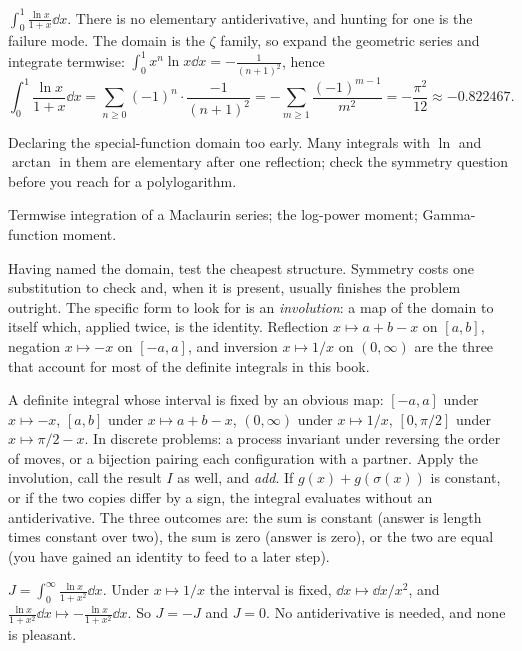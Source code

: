 \begin{worked}
$\displaystyle\int_{0}^{1}\frac{\ln x}{1+x}\dd x$. There is no elementary antiderivative, and hunting for one is the failure mode. The domain is the $\zeta$ family, so expand the geometric series and integrate termwise: $\int_{0}^{1}x^{n}\ln x\dd x=-\frac{1}{(n+1)^{2}}$, hence
\[
\int_{0}^{1}\frac{\ln x}{1+x}\dd x=\sum_{n\geq 0}(-1)^{n}\cdot\frac{-1}{(n+1)^{2}}=-\sum_{m\geq 1}\frac{(-1)^{m-1}}{m^{2}}=-\frac{\pi^{2}}{12}\approx -0.822467 .
\]
\end{worked}

\begin{trap}
Declaring the special-function domain too early. Many integrals with $\ln$ and $\arctan$ in them are elementary after one reflection; check the symmetry question before you reach for a polylogarithm.
\end{trap}

\begin{seealsob}Termwise integration of a Maclaurin series; the log-power moment; Gamma-function moment.\end{seealsob}

Having named the domain, test the cheapest structure. Symmetry costs one substitution to check and, when it is present, usually finishes the problem outright. The specific form to look for is an \emph{involution}: a map of the domain to itself which, applied twice, is the identity. Reflection $x\mapsto a+b-x$ on $[a,b]$, negation $x\mapsto -x$ on $[-a,a]$, and inversion $x\mapsto 1/x$ on $(0,\infty)$ are the three that account for most of the definite integrals in this book.

\cue A definite integral whose interval is fixed by an obvious map: $[-a,a]$ under $x\mapsto -x$, $[a,b]$ under $x\mapsto a+b-x$, $(0,\infty)$ under $x\mapsto 1/x$, $[0,\pi/2]$ under $x\mapsto \pi/2-x$. In discrete problems: a process invariant under reversing the order of moves, or a bijection pairing each configuration with a partner.
\method Apply the involution, call the result $I$ as well, and \emph{add}. If $g(x)+g(\sigma(x))$ is constant, or if the two copies differ by a sign, the integral evaluates without an antiderivative. The three outcomes are: the sum is constant (answer is length times constant over two), the sum is zero (answer is zero), or the two are equal (you have gained an identity to feed to a later step).

\begin{worked}
$\displaystyle J=\int_{0}^{\infty}\frac{\ln x}{1+x^{2}}\dd x$. Under $x\mapsto 1/x$ the interval is fixed, $\dd x\mapsto \dd x/x^{2}$, and $\frac{\ln x}{1+x^{2}}\dd x\mapsto -\frac{\ln x}{1+x^{2}}\dd x$. So $J=-J$ and $J=0$. No antiderivative is needed, and none is pleasant.
\end{worked}

